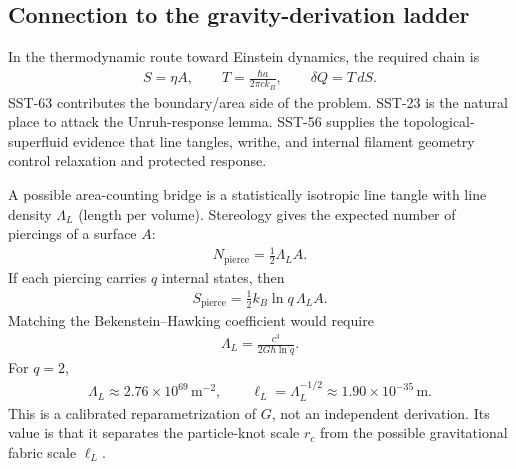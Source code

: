\documentclass[11pt]{article}
\begin{document}
    \subsection{Connection to the gravity-derivation ladder}

        In the thermodynamic route toward Einstein dynamics, the required chain
        is
        \begin{align}
            S=\eta A,
            \qquad
            T=\frac{\hbar a}{2\pi c k_B},
            \qquad
            \delta Q=T\,dS .
            \label{eq:sst63_jacobson_requirements}
        \end{align}
        SST-63 contributes the boundary/area side of the problem.  SST-23 is the
        natural place to attack the Unruh-response lemma.  SST-56 supplies the
        topological-superfluid evidence that line tangles, writhe, and internal
        filament geometry control relaxation and protected response.

        A possible area-counting bridge is a statistically isotropic line tangle
        with line density \(\Lambda_L\) (length per volume).  Stereology gives
        the expected number of piercings of a surface \(A\):
        \begin{align}
            N_{\mathrm{pierce}}
            =
            \frac{1}{2}\Lambda_L A .
            \label{eq:sst63_piercing_count}
        \end{align}
        If each piercing carries \(q\) internal states, then
        \begin{align}
            S_{\mathrm{pierce}}
            =
            \frac{1}{2}k_B\ln q\,\Lambda_L A .
            \label{eq:sst63_piercing_entropy}
        \end{align}
        Matching the Bekenstein--Hawking coefficient would require
        \begin{align}
            \Lambda_L
            =
            \frac{c^3}{2G\hbar\ln q}.
            \label{eq:sst63_linelength_density}
        \end{align}
        For \(q=2\),
        \begin{align}
            \Lambda_L
            \approx
            2.76\times10^{69}\,\mathrm{m^{-2}},
            \qquad
            \ell_L=\Lambda_L^{-1/2}
            \approx
            1.90\times10^{-35}\,\mathrm{m}.
            \label{eq:sst63_planckian_tangle_spacing}
        \end{align}
        This is a calibrated reparametrization of \(G\), not an independent
        derivation.  Its value is that it separates the particle-knot scale
        \(r_c\) from the possible gravitational fabric scale \(\ell_L\).
\end{document}
